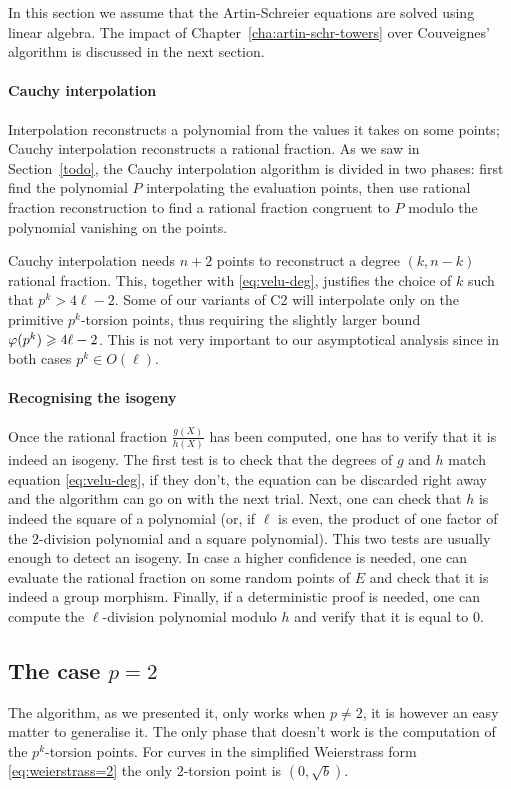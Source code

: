 In this section we assume that the Artin-Schreier equations are solved
using linear algebra. The impact of
Chapter~\ref{cha:artin-schr-towers} over Couveignes' algorithm is
discussed in the next section.


\paragraph{Cauchy interpolation}
Interpolation reconstructs a polynomial from the values it takes on
some points; Cauchy interpolation reconstructs a rational fraction. As
we saw in Section~\ref{todo}, the Cauchy interpolation algorithm is
divided in two phases: first find the polynomial $P$ interpolating the
evaluation points, then use rational fraction reconstruction to find a
rational fraction congruent to $P$ modulo the polynomial vanishing on
the points.

Cauchy interpolation needs $n+2$ points to reconstruct a degree
$(k,n-k)$ rational fraction. This, together with \eqref{eq:velu-deg},
justifies the choice of $k$ such that $p^k > 4\ell - 2$. Some of our
variants of C2 will interpolate only on the primitive $p^k$-torsion
points, thus requiring the slightly larger bound $\varphi(p^k) \geqslant
4\ell - 2$. This is not very important to our asymptotical analysis
since in both cases $p^k \in O(\ell)$.

\paragraph{Recognising the isogeny}
Once the rational fraction $\frac{g(X)}{h(X)}$ has been computed, one
has to verify that it is indeed an isogeny. The first test is to check
that the degrees of $g$ and $h$ match equation \eqref{eq:velu-deg}, if
they don't, the equation can be discarded right away and the algorithm
can go on with the next trial. Next, one can check that $h$ is indeed
the square of a polynomial (or, if $\ell$ is even, the product of one
factor of the $2$-division polynomial and a square polynomial). This
two tests are usually enough to detect an isogeny. In case a higher
confidence is needed, one can evaluate the rational fraction on some
random points of $E$ and check that it is indeed a group
morphism. Finally, if a deterministic proof is needed, one can compute
the $\ell$-division polynomial modulo $h$ and verify that it is equal
to $0$.


\subsection{The case $p=2$}
\label{sec:p=2}
The algorithm, as we presented it, only works when $p\ne2$, it is
however an easy matter to generalise it. The only phase that doesn't
work is the computation of the $p^k$-torsion points. For curves in the
simplified Weierstrass form \eqref{eq:weierstrass=2} the only
$2$-torsion point is $(0,\sqrt{b})$.

